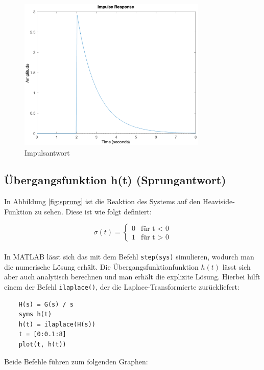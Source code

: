 \begin{figure}[H]
    \label{fig:impuls}
    \centering
    \includegraphics[width=0.8\textwidth]{Bilder/ImpulsAntwortPT1Tt.eps}
    \caption{Impulsantwort}
 \end{figure}

\subsection{Übergangsfunktion h(t) (Sprungantwort)}

In Abbildung \ref{fig:sprung} ist die Reaktion des Systems auf den Heaviside-Funktion zu sehen. Diese ist wie folgt definiert:

\[
\sigma (t) = \begin{cases} 0 & \text{für t < 0} \\ 1 & \text{für t > 0} \end{cases}  
\]
\\
In MATLAB lässt sich das mit dem Befehl \texttt{step(sys)} simulieren, wodurch man die numerische Lösung erhält. Die Übergangsfunktionfunktion $h(t)$ lässt sich aber auch analytisch berechnen und man erhält die explizite Lösung. Hierbei hilft einem der Befehl \texttt{ilaplace()}, der die Laplace-Transformierte zurückliefert:

\begin{lstlisting}
    H(s) = G(s) / s
    syms h(t)
    h(t) = ilaplace(H(s))
    t = [0:0.1:8]
    plot(t, h(t))
\end{lstlisting} 

Beide Befehle führen zum folgenden Graphen:


